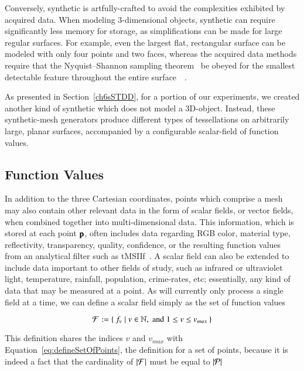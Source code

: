 Conversely, synthetic \tdd{} is artfully-crafted to avoid the complexities exhibited by acquired data. When modeling 3-dimensional objects, synthetic \tdd{} can require significantly less memory for storage, as simplifications can be made for large regular surfaces. For example, even the largest flat, rectangular surface can be modeled with only four points and two faces, whereas the acquired data methods require that the Nyquist–Shannon sampling theorem~\cite[p.~249-250]{Jaehne97} be obeyed for the smallest detectable feature throughout the entire surface~\cite[p.~19]{Mara12}~\cite[p.~3]{Mara17}.

As presented in Section~\ref{ch6sSTDD}, for a portion of our experiments, we created another kind of synthetic \tdd{} which does not model a 3D-object. Instead, these synthetic-mesh generators produce different types of tessellations on arbitrarily large, planar surfaces, accompanied by a configurable scalar-field of function values.

%
%
%
\subsection{Function Values}
\label{ch2sTDDssFV}
In addition to the three Cartesian coordinates, points which comprise a mesh may also contain other relevant data in the form of scalar fields, or vector fields, when combined together into multi-dimensional data. This information, which is stored at each point $\mathbf{p}$, often includes data regarding RGB color, material type, reflectivity, transparency, quality, confidence, or the resulting function values from an analytical filter such as \gls{tMSIIf}~\cite[p.~21]{Mara12}. A scalar field  can also be extended to include data important to other fields of study, such as infrared or ultraviolet light, temperature, rainfall, population, crime-rates, etc; essentially, any kind of data that may be measured at a point. As  will currently only process a single field at a time, we can define a scalar field simply as the set of function values

\begin{equation}
	\mathcal{F} := \left \{\: f_v \mid v \in \mathbb{N}, \;\text{and}\; 1\leq v \leq v_{max} \:\right \}
	\label{eq:defineSetOfFunctionValues}
\end{equation}%
%
%

This definition shares the indices $v$ and $v_{max}$ with Equation~\ref{eq:defineSetOfPoints}, the definition for a set of points, because it is indeed a fact that the cardinality of $|\mathcal{F}|$ must be equal to $|\mathcal{P}|$

